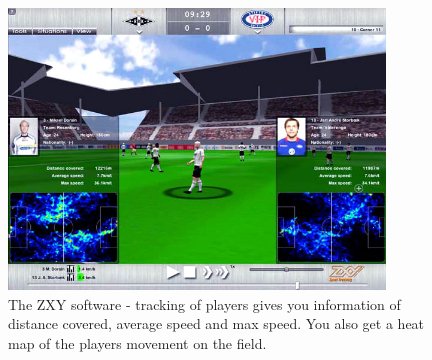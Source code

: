 \begin{figure}[ht!]
\centering
\includegraphics[width=100mm]{images/general/zxysoftware.png}
\caption{The ZXY software - tracking of players gives you information of distance covered, average speed and max speed. You also get a heat map of the players movement on the field.}
\label{overflow}
\end{figure}

\cite{dailymailOnStatistics}
